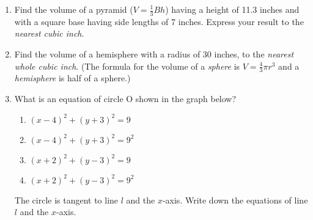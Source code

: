 \begin{enumerate}
\item Find the volume of a pyramid ($V=\frac{1}{3}Bh$) having a height of 11.3 inches and with a square base having side lengths of 7 inches. Express your result to the \emph{nearest cubic inch}. \vspace{5cm}

\item Find the volume of a hemisphere with a radius of 30 inches, to the \emph{nearest whole cubic inch}. (The formula for the volume of a \emph{sphere} is $V=\frac{4}{3}\pi r^3$ and a \emph{hemisphere} is half of a sphere.) \vspace{5cm}

\item What is an equation of circle O shown in the graph below?
  \begin{center}
  \end{center}
  \begin{multicols}{2}
    \begin{enumerate}
      \item $(x-4)^2+(y+3)^2=9$
      \item $(x-4)^2+(y+3)^2=9^2$
      \item $(x+2)^2+(y-3)^2=9$
      \item $(x+2)^2+(y-3)^2=9^2$
    \end{enumerate}
  \end{multicols}
  The circle is tangent to line $l$ and the $x$-axis. Write down the equations of line $l$ and the $x$-axis.



\end{enumerate}

